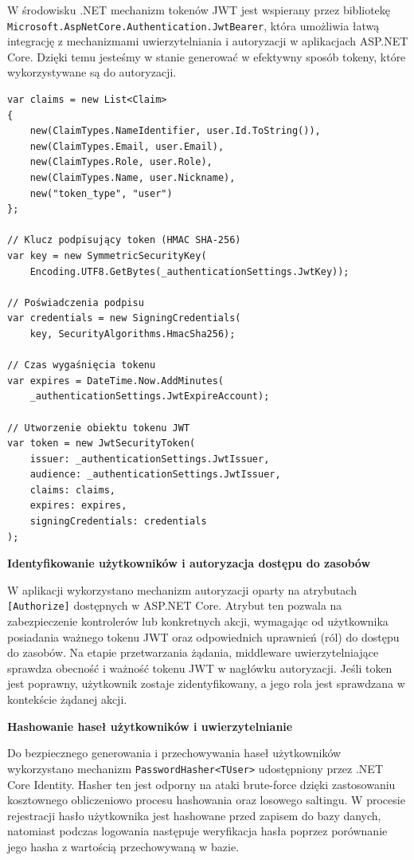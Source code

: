 W środowisku .NET mechanizm tokenów JWT jest wspierany przez bibliotekę \texttt{Microsoft.AspNetCore.Authentication.JwtBearer}, która umożliwia łatwą integrację z mechanizmami uwierzytelniania i autoryzacji w aplikacjach ASP.NET Core. Dzięki temu jesteśmy w stanie generować w efektywny sposób tokeny, które wykorzystywane są do autoryzacji. 

\begin{lstlisting}[language={[Sharp]C}, caption={Generowanie tokenu JWT w warstwie backendu}, label={lst:jwt-generation}]
var claims = new List<Claim>
{
    new(ClaimTypes.NameIdentifier, user.Id.ToString()),
    new(ClaimTypes.Email, user.Email),
    new(ClaimTypes.Role, user.Role),
    new(ClaimTypes.Name, user.Nickname),
    new("token_type", "user")
};

// Klucz podpisujący token (HMAC SHA-256)
var key = new SymmetricSecurityKey(
    Encoding.UTF8.GetBytes(_authenticationSettings.JwtKey));

// Poświadczenia podpisu
var credentials = new SigningCredentials(
    key, SecurityAlgorithms.HmacSha256);

// Czas wygaśnięcia tokenu
var expires = DateTime.Now.AddMinutes(
    _authenticationSettings.JwtExpireAccount);

// Utworzenie obiektu tokenu JWT
var token = new JwtSecurityToken(
    issuer: _authenticationSettings.JwtIssuer,
    audience: _authenticationSettings.JwtIssuer,
    claims: claims,
    expires: expires,
    signingCredentials: credentials
);
\end{lstlisting}

\textbf{Identyfikowanie użytkowników i autoryzacja dostępu do zasobów}

W aplikacji wykorzystano mechanizm autoryzacji oparty na atrybutach \texttt{[Authorize]} dostępnych w ASP.NET Core. Atrybut ten pozwala na zabezpieczenie kontrolerów lub konkretnych akcji, wymagając od użytkownika posiadania ważnego tokenu JWT oraz odpowiednich uprawnień (ról) do dostępu do zasobów. 
Na etapie przetwarzania żądania, middleware uwierzytelniające sprawdza obecność i ważność tokenu JWT w nagłówku autoryzacji. Jeśli token jest poprawny, użytkownik zostaje zidentyfikowany, a jego rola jest sprawdzana w kontekście żądanej akcji.


\textbf{Hashowanie haseł użytkowników i uwierzytelnianie}

Do bezpiecznego generowania i przechowywania haseł użytkowników wykorzystano mechanizm \texttt{PasswordHasher<TUser>} udostępniony przez .NET Core Identity. Hasher ten jest odporny na ataki brute-force dzięki zastosowaniu kosztownego obliczeniowo procesu hashowania oraz losowego saltingu. 
W procesie rejestracji hasło użytkownika jest hashowane przed zapisem do bazy danych, natomiast podczas logowania następuje weryfikacja hasła poprzez porównanie jego hasha z wartością przechowywaną w bazie.

